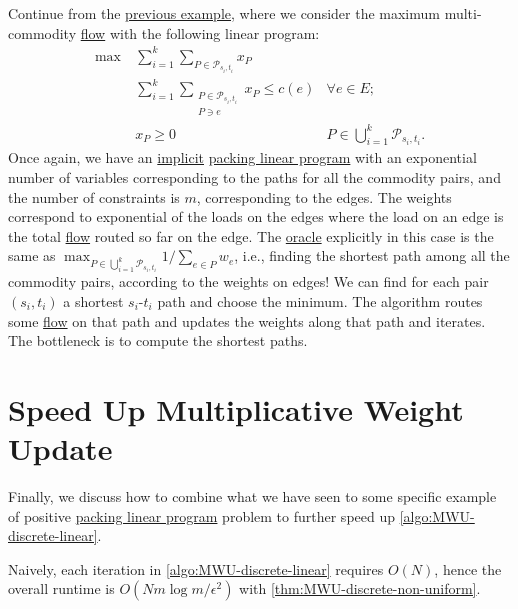 \begin{eg}
	Continue from the \hyperref[eg:maximum-multi-commodity-flow-MWU]{previous example}, where we consider the maximum multi-commodity \hyperref[def:flow]{flow} with the following linear program:
	\[
		\begin{aligned}
			\max~ & \sum_{i=1}^{k} \sum_{P \in \mathcal{P} _{s_i, t_i}} x_P                                                         \\
			      & \sum_{i=1}^{k} \sum_{\substack{P \in\mathcal{P} _{s_i, t_i}                                                     \\ P \ni e}} x_P \leq c(e) & \forall e \in E ;                                  \\
			      & x_P \geq 0                                                  & P \in \bigcup_{i=1}^{k} \mathcal{P} _{s_i, t_i} .
		\end{aligned}
	\]
	Once again, we have an \hyperref[def:implicit-LP]{implicit} \hyperref[def:packing-LP]{packing linear program} with an exponential number of variables corresponding to the paths for all the commodity pairs, and the number of constraints is \(m\), corresponding to the edges. The weights correspond to exponential of the loads on the edges where the load on an edge is the total \hyperref[def:flow]{flow} routed so far on the edge. The \hyperref[eq:MWU-oracle-LP]{oracle} explicitly in this case is the same as \(\max _{P \in \bigcup_{i=1}^{k} \mathcal{P} _{s_i, t_i}} 1 / \sum_{e \in P} w_e\), i.e., finding the shortest path among all the commodity pairs, according to the weights on edges! We can find for each pair \((s_i, t_i)\) a shortest \(s_i\)-\(t_i\) path and choose the minimum. The algorithm routes some \hyperref[def:flow]{flow} on that path and updates the weights along that path and iterates. The bottleneck is to compute the shortest paths.
\end{eg}

\section{Speed Up Multiplicative Weight Update}
Finally, we discuss how to combine what we have seen to some specific example of positive \hyperref[def:packing-LP]{packing linear program} problem to further speed up \autoref{algo:MWU-discrete-linear}.

\begin{prev}
	Naively, each iteration in \autoref{algo:MWU-discrete-linear} requires \(O(N)\), hence the overall runtime is \(O(N m \log m / \epsilon ^2)\) with \autoref{thm:MWU-discrete-non-uniform}.
\end{prev}

